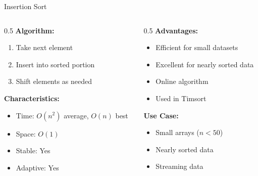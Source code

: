 \documentclass[aspectratio=169,xcolor=dvipsnames]{beamer}
\begin{document}
\begin{frame}{Insertion Sort}
  \begin{columns}
    \begin{column}{0.5\textwidth}
      \textbf{Algorithm:}
      \begin{enumerate}
        \item Take next element
        \item Insert into sorted portion
        \item Shift elements as needed
      \end{enumerate}

      \vspace{0.3cm}
      \textbf{Characteristics:}
      \begin{itemize}
        \item Time: $O(n^2)$ average, $O(n)$ best
        \item Space: $O(1)$
        \item Stable: Yes
        \item Adaptive: Yes
      \end{itemize}
    \end{column}

    \begin{column}{0.5\textwidth}
      \textbf{Advantages:}
      \begin{itemize}
        \item Efficient for small datasets
        \item Excellent for nearly sorted data
        \item Online algorithm
        \item Used in Timsort
      \end{itemize}

      \vspace{0.3cm}
      \textbf{Use Case:}
      \begin{itemize}
        \item Small arrays ($n < 50$)
        \item Nearly sorted data
        \item Streaming data
      \end{itemize}
    \end{column}
  \end{columns}
\end{frame}
\end{document}
